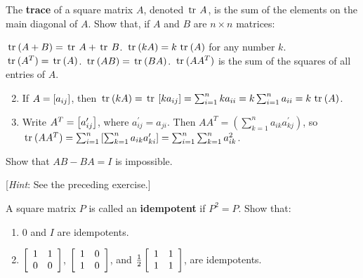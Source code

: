 \begin{multicols}{2}
\begin{ex}
The \textbf{trace} of a square matrix $A$, denoted $\thinspace\operatorname{tr \medspace}A$, is the sum of the elements on the main diagonal of $A$. Show that, if $A$ and $B$ are $n \times n$ matrices:
\begin{exenumerate}
\exitem* $\thinspace\operatorname{tr\medspace}(A + B) = \thinspace\operatorname{tr \medspace}A + \thinspace\operatorname{tr \medspace}B$.
\exitem* $\thinspace\operatorname{tr\medspace}(kA) = k \thinspace\operatorname{tr\medspace}(A)$ for any number $k$.
\exitem $\thinspace\operatorname{tr\medspace}(A^{T}) = \thinspace\operatorname{tr\medspace}(A)$.
\exitem $\thinspace\operatorname{tr\medspace}(AB) = \thinspace\operatorname{tr\medspace}(BA)$.
\exitem* $\thinspace\operatorname{tr\medspace}(AA^{T})$ is the sum of the squares of all entries of $A$.
\end{exenumerate}
\begin{sol}
\begin{enumerate}[label={\alph*.}]
\setcounter{enumi}{1}
\item  If $A = \left[ a_{ij} \right]$, then $\thinspace\operatorname{tr\medspace}(kA) = \thinspace\operatorname{tr\medspace}\left[ ka_{ij} \right] = \sum_{i=1}^{n} ka_{ii} = k\sum_{i=1}^{n} a_{ii} = k \thinspace\operatorname{tr\medspace}(A)$.


\setcounter{enumi}{4}
\item  Write $A^{T} = \left[ a_{ij}^\prime \right]$, where $a_{ij}^\prime = a_{ji}$. Then $AA^{T} = \left( \sum_{k=1}^{n} a_{ik}a_{kj}^\prime \right)$, so $\thinspace\operatorname{tr\medspace}(AA^{T}) = \sum_{i=1}^{n} \left[ \sum_{k=1}^{n} a_{ik}a_{ki}^\prime \right] = \sum_{i=1}^{n} \sum_{k=1}^{n} a_{ik}^{2}$.


\end{enumerate}
\end{sol}
\end{ex}

\begin{ex}
Show that $AB - BA = I$ is impossible.


[\textit{Hint}: See the preceding exercise.]
\end{ex}

\columnbreak
\begin{ex}
A square matrix $P$ is called an \newline \textbf{idempotent} if $P^{2} = P$. Show that:


\begin{enumerate}[label={\alph*.}]
\item $0$ and $I$ are idempotents.

\item $\left[ \begin{array}{rr}
1 & 1 \\
0 & 0
\end{array} \right]$, $\left[ \begin{array}{rr}
1 & 0 \\
1 & 0
\end{array} \right]$, and $\tfrac{1}{2} \left[ \begin{array}{rr}
 1 & 1 \\
 1 & 1
 \end{array} \right]$, are idempotents.


\end{enumerate}
\end{ex}
\end{multicols}
